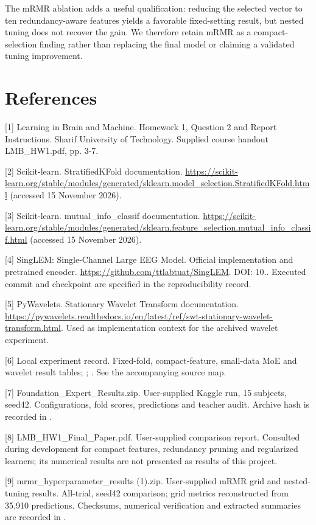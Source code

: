 \documentclass[10pt,a4paper]{article}
\begin{document}
The mRMR ablation adds a useful qualification: reducing the selected vector to ten redundancy-aware features yields a favorable fixed-setting result, but nested tuning does not recover the gain. We therefore retain mRMR as a compact-selection finding rather than replacing the final model or claiming a validated tuning improvement.


\section*{References}

[1] Learning in Brain and Machine. Homework 1, Question 2 and Report Instructions. Sharif University of Technology. Supplied course handout LMB\_HW1.pdf, pp. 3-7.


[2] Scikit-learn. StratifiedKFold documentation. \url{https://scikit-learn.org/stable/modules/generated/sklearn.model_selection.StratifiedKFold.html} (accessed 15 November 2026).


[3] Scikit-learn. mutual\_info\_classif documentation. \url{https://scikit-learn.org/stable/modules/generated/sklearn.feature_selection.mutual_info_classif.html} (accessed 15 November 2026).


[4] SingLEM: Single-Channel Large EEG Model. Official implementation and pretrained encoder. \url{https://github.com/ttlabtuat/SingLEM}. DOI: 10.. Executed commit and checkpoint are specified in the reproducibility record.


[5] PyWavelets. Stationary Wavelet Transform documentation. \url{https://pywavelets.readthedocs.io/en/latest/ref/swt-stationary-wavelet-transform.html}. Used as implementation context for the archived wavelet experiment.


[6] Local experiment record. Fixed-fold, compact-feature, small-data MoE and wavelet result tables; ; . See the accompanying source map.


[7] Foundation\_Expert\_Results.zip. User-supplied Kaggle run, 15 subjects, seed42. Configurations, fold scores, predictions and teacher audit. Archive hash is recorded in .


[8] LMB\_HW1\_Final\_Paper.pdf. User-supplied comparison report. Consulted during development for compact features, redundancy pruning and regularized learners; its numerical results are not presented as results of this project.


[9] mrmr\_hyperparameter\_results (1).zip. User-supplied mRMR grid and nested-tuning results. All-trial, seed42 comparison; grid metrics reconstructed from 35,910 predictions. Checksums, numerical verification and extracted summaries are recorded in .
\end{document}
